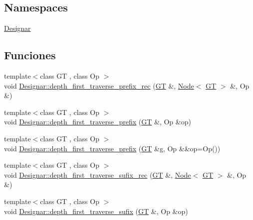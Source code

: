 \subsection*{Namespaces}
\begin{DoxyCompactItemize}
\item 
 \hyperlink{namespace_designar}{Designar}
\end{DoxyCompactItemize}
\subsection*{Funciones}
\begin{DoxyCompactItemize}
\item 
{\footnotesize template$<$class GT , class Op $>$ }\\void \hyperlink{namespace_designar_a0b89964c32afcc315905100d3ae49ad6}{Designar\+::depth\+\_\+first\+\_\+traverse\+\_\+prefix\+\_\+rec} (\hyperlink{demo-buildgraph_8_c_a3001c40d2c31ca87ed96cd7d1334a55e}{GT} \&, \hyperlink{test-mtreenode_8_c_a17a24b0725f59987143c5faf63c4dc6f}{Node}$<$ \hyperlink{demo-buildgraph_8_c_a3001c40d2c31ca87ed96cd7d1334a55e}{GT} $>$ \&, Op \&)
\item 
{\footnotesize template$<$class GT , class Op $>$ }\\void \hyperlink{namespace_designar_a2c0d9c0ea5841058afe514c4451ab869}{Designar\+::depth\+\_\+first\+\_\+traverse\+\_\+prefix} (\hyperlink{demo-buildgraph_8_c_a3001c40d2c31ca87ed96cd7d1334a55e}{GT} \&, Op \&op)
\item 
{\footnotesize template$<$class GT , class Op $>$ }\\void \hyperlink{namespace_designar_afaa79311647a603f5c95d575f67ea767}{Designar\+::depth\+\_\+first\+\_\+traverse\+\_\+prefix} (\hyperlink{demo-buildgraph_8_c_a3001c40d2c31ca87ed96cd7d1334a55e}{GT} \&g, Op \&\&op=Op())
\item 
{\footnotesize template$<$class GT , class Op $>$ }\\void \hyperlink{namespace_designar_ab028f52b5df8eed5dadeda85d45fa0f2}{Designar\+::depth\+\_\+first\+\_\+traverse\+\_\+sufix\+\_\+rec} (\hyperlink{demo-buildgraph_8_c_a3001c40d2c31ca87ed96cd7d1334a55e}{GT} \&, \hyperlink{test-mtreenode_8_c_a17a24b0725f59987143c5faf63c4dc6f}{Node}$<$ \hyperlink{demo-buildgraph_8_c_a3001c40d2c31ca87ed96cd7d1334a55e}{GT} $>$ \&, Op \&)
\item 
{\footnotesize template$<$class GT , class Op $>$ }\\void \hyperlink{namespace_designar_a91a3b6c7321dec6f2d9579721af465a1}{Designar\+::depth\+\_\+first\+\_\+traverse\+\_\+sufix} (\hyperlink{demo-buildgraph_8_c_a3001c40d2c31ca87ed96cd7d1334a55e}{GT} \&, Op \&op)

\end{DoxyCompactItemize}
